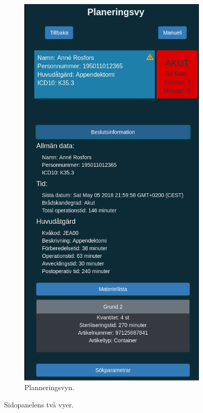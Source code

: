 \begin{figure}[H]
\begin{subfigure}[b]{0.4\linewidth}
	\end{subfigure}
	\begin{subfigure}[b]{0.4\linewidth}
		\includegraphics[width=\linewidth]{Figures/planning.png}
		\caption{Planneringsvyn.}
		\label{fig:planeringsvy}
	\end{subfigure}
	\caption{Sidopanelens två vyer.}
	\label{fig:sidepanel}
\end{figure}


